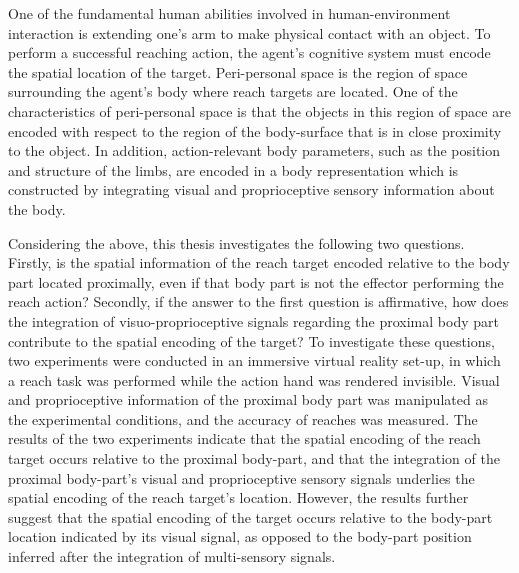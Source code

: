 One of the fundamental human abilities involved in human-environment interaction is extending one's arm to make physical contact with an object. To perform a successful reaching action, the agent's cognitive system must encode the spatial location of the target. Peri-personal space is the region of space surrounding the agent's body where reach targets are located. One of the characteristics of peri-personal space is that the objects in this region of space are encoded with respect to the region of the body-surface that is in close proximity to the object. In addition, action-relevant body parameters, such as the position and structure of the limbs, are encoded in a body representation which is constructed by integrating visual and proprioceptive sensory information about the body. 

Considering the above, this thesis investigates the following two questions. Firstly, is the spatial information of the reach target encoded relative to the body part located proximally, even if that body part is not the effector performing the reach action? Secondly, if the answer to the first question is affirmative, how does the integration of visuo-proprioceptive signals regarding the proximal body part contribute to the spatial encoding of the target? To investigate these questions, two  experiments were conducted in an immersive virtual reality set-up, in which a reach task was performed while the action hand was rendered invisible. Visual and proprioceptive information of the proximal body part was manipulated as the experimental conditions, and the accuracy of reaches was measured. The results of the two experiments indicate that the spatial encoding of the reach target occurs relative to the proximal body-part, and that the integration of the proximal body-part's visual and proprioceptive sensory signals underlies the spatial encoding of the reach target's location. However, the results further suggest that the spatial encoding of the target occurs relative to the body-part location indicated by its visual signal, as opposed to the body-part position inferred after the integration of multi-sensory signals.










